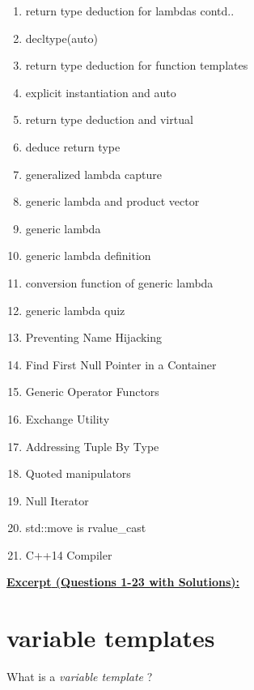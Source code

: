 \begin{enumerate}[noitemsep]
 \item return type deduction for lambdas contd..
 \item decltype(auto)
 \item return type deduction for function templates
 \item explicit instantiation and auto
 \item return type deduction and virtual
 \item deduce return type
 \item generalized lambda capture
 \item generic lambda and product vector
 \item generic lambda
 \item generic lambda definition
 \item conversion function of generic lambda
 \item generic lambda quiz
 \item Preventing Name Hijacking
 \item Find First Null Pointer in a Container
 \item Generic Operator Functors
 \item Exchange Utility
 \item Addressing Tuple By Type
 \item Quoted manipulators
 \item Null Iterator
 \item std::move is rvalue\_cast
 \item C++14 Compiler
 \end{enumerate}
 
 \hrulefill

\underline{\textbf{\textcolor{BurntOrange}{Excerpt} \textcolor{Sepia}{(Questions 1-23 with Solutions):}}}

\section{variable templates}


\begin{Exercise}[title={variable template}, difficulty=3, label=ex01]
What is a \emph{variable template} ?
\end{Exercise}



